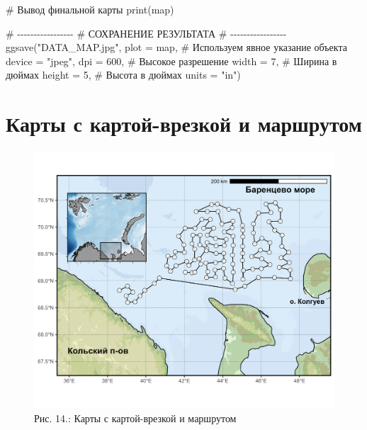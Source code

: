 \documentclass[
  letterpaper,
  DIV=11,
  numbers=noendperiod]{scrreprt}
\newenvironment{Shaded}{\begin{snugshade}}{\end{snugshade}}
\newcommand{\AttributeTok}[1]{\textcolor[rgb]{0.40,0.45,0.13}{#1}}
\newcommand{\CommentTok}[1]{\textcolor[rgb]{0.37,0.37,0.37}{#1}}
\newcommand{\DecValTok}[1]{\textcolor[rgb]{0.68,0.00,0.00}{#1}}
\newcommand{\FunctionTok}[1]{\textcolor[rgb]{0.28,0.35,0.67}{#1}}
\newcommand{\NormalTok}[1]{\textcolor[rgb]{0.00,0.23,0.31}{#1}}
\newcommand{\StringTok}[1]{\textcolor[rgb]{0.13,0.47,0.30}{#1}}
\begin{document}
\begin{Shaded}
\begin{Highlighting}[]
\CommentTok{\# Вывод финальной карты}
\FunctionTok{print}\NormalTok{(map)}

\CommentTok{\# {-}{-}{-}{-}{-}{-}{-}{-}{-}{-}{-}{-}{-}{-}{-}{-}{-}}
\CommentTok{\# СОХРАНЕНИЕ РЕЗУЛЬТАТА}
\CommentTok{\# {-}{-}{-}{-}{-}{-}{-}{-}{-}{-}{-}{-}{-}{-}{-}{-}{-}}
\FunctionTok{ggsave}\NormalTok{(}\StringTok{"DATA\_MAP.jpg"}\NormalTok{, }
       \AttributeTok{plot =}\NormalTok{ map,          }\CommentTok{\# Используем явное указание объекта}
       \AttributeTok{device =} \StringTok{"jpeg"}\NormalTok{, }
       \AttributeTok{dpi =} \DecValTok{600}\NormalTok{,           }\CommentTok{\# Высокое разрешение}
       \AttributeTok{width =} \DecValTok{7}\NormalTok{,           }\CommentTok{\# Ширина в дюймах}
       \AttributeTok{height =} \DecValTok{5}\NormalTok{,          }\CommentTok{\# Высота в дюймах}
       \AttributeTok{units =} \StringTok{"in"}\NormalTok{)}
\end{Highlighting}
\end{Shaded}

\section{Карты с картой-врезкой и
маршрутом}\label{ux43aux430ux440ux442ux44b-ux441-ux43aux430ux440ux442ux43eux439-ux432ux440ux435ux437ux43aux43eux439-ux438-ux43cux430ux440ux448ux440ux443ux442ux43eux43c}

\begin{figure}[H]

{\centering \includegraphics[width=0.8\linewidth,height=\textheight,keepaspectratio]{images/KARTOGRAPH14.jpg}

}

\caption{Рис. 14.: Карты с картой-врезкой и маршрутом}

\end{figure}%
\end{document}
